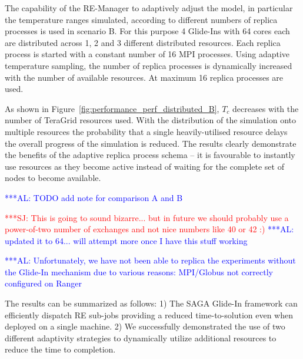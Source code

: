\documentclass{rspublic}
\newcommand{\alnote}[1]{ {\textcolor{blue} { ***AL: #1 }}}
\newcommand{\jhanote}[1]{ {\textcolor{red} { ***SJ: #1 }}}
\newcommand{\alnote}[1]{}
\newcommand{\jhanote}[1]{}
\begin{document}
{The capability of the RE-Manager to adaptively adjust the model, in particular
the temperature ranges simulated, according to different numbers of replica processes 
is used in scenario B. For this purpose 4 Glide-Ins with 64 cores each are 
distributed across 1, 2 and 3 different distributed resources. Each replica process
is started with a constant number of 16 MPI processes. Using adaptive
temperature sampling, the number of replica processes is dynamically increased with
the number of available resources. At maximum 16 replica processes are used.

As shown in Figure~\ref{fig:performance_perf_distributed_B}, $T_{c}$ 
decreases with the number of TeraGrid resources used. 
With the distribution of the simulation onto multiple resources the probability
that a single heavily-utilised resource delays the overall progress of
the simulation is reduced. 
The results clearly demonstrate the benefits of the
adaptive replica process schema -- it is favourable to 
instantly use resources as they become active 
instead of waiting for the complete set of nodes to become
available.

\alnote{TODO add note for comparison A and B}

\jhanote{This is going to sound bizarre... but in future we should
  probably use a power-of-two number of exchanges and not nice numbers
  like 40 or 42 :)}           
\alnote{updated it to 64... will attempt more once I have this stuff working}

                                              
\alnote{Unfortunately, we have not been able to replica the
  experiments without the Glide-In mechanism due to various reasons:
  MPI/Globus not correctly configured on Ranger}

The results can be summarized as follows: 1) The SAGA Glide-In
framework can efficiently dispatch RE sub-jobs providing a reduced
time-to-solution even when deployed on a single machine.  2) We successfully
demonstrated the use of two different adaptivity strategies
to dynamically utilize additional resources to reduce the time to completion.


}
\end{document}
